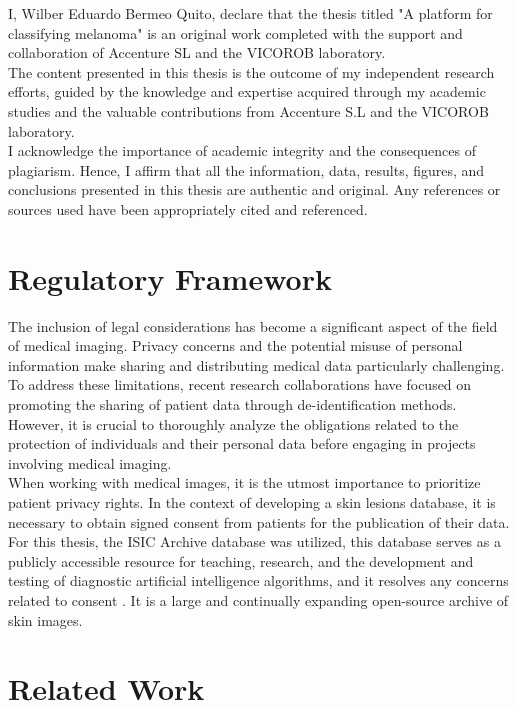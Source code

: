 I, Wilber Eduardo Bermeo Quito, declare that the thesis titled "A platform for classifying melanoma" is an original work completed with the support and collaboration of Accenture SL and the VICOROB laboratory. \\

The content presented in this thesis is the outcome of my independent research efforts, guided by the knowledge and expertise acquired through my academic studies and the valuable contributions from Accenture S.L and the VICOROB laboratory. \\

I acknowledge the importance of academic integrity and the consequences of plagiarism. Hence, I affirm that all the information, data, results, figures, and conclusions presented in this thesis are authentic and original. Any references or sources used have been appropriately cited and referenced.

\section{Regulatory Framework}

The inclusion of legal considerations has become a significant aspect of the field of medical imaging. Privacy concerns and the potential misuse of personal information make sharing and distributing medical data particularly challenging. To address these limitations, recent research collaborations have focused on promoting the sharing of patient data through de-identification methods. However, it is crucial to thoroughly analyze the obligations related to the protection of individuals and their personal data before engaging in projects involving medical imaging. \\

When working with medical images, it is the utmost importance to prioritize patient privacy rights. In the context of developing a skin lesions database, it is necessary to obtain signed consent from patients for the publication of their data. For this thesis, the ISIC Archive database was utilized, this database serves as a publicly accessible resource for teaching, research, and the development and testing of diagnostic artificial intelligence algorithms, and it resolves any concerns related to consent \cite{IsicArchive}. It is a large and continually expanding open-source archive of skin images.

\section{Related Work}

